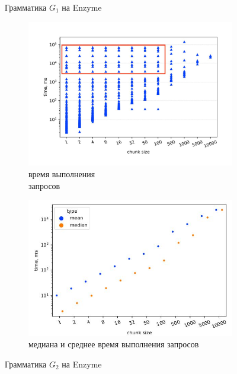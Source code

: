 \documentclass[14pt]{matmex-diploma-custom}
\theoremstyle{definition}
\begin{document}
\begin{figure}[H]
\begin{subfigure}[b]{0.5\textwidth}
    \label{2}
    \end{subfigure} \caption{Грамматика $G_1$ на Enzyme}
    \label{old3}
    \begin{subfigure}[b]{0.5\textwidth}
    \centering
    \includegraphics[width=\textwidth]{pics/subclass_old.pdf_1.jpg} \caption{время выполнения \\ запросов}
    \label{3}
    \end{subfigure}%
    \begin{subfigure}[b]{0.5\textwidth}
    \centering
    \includegraphics[width=\columnwidth]{pics/subclass_old_mean&median.pdf_1.jpg} \caption{медиана и среднее время выполнения запросов}
    \label{4}
    \end{subfigure} \caption{Грамматика $G_2$ на Enzyme}
    \label{old2}
        \end{figure}
\end{document}

